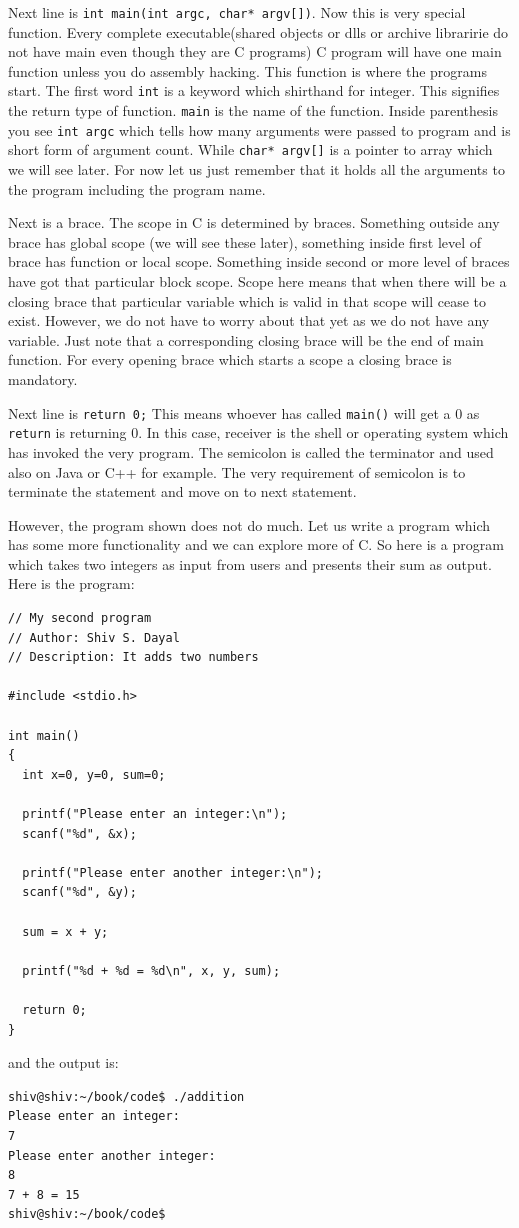 Next line is \texttt{int main(int argc, char* argv[])}. Now this is very special
function. Every complete executable(shared objects or dlls or archive
libraririe do not have main even though they are C programs) C program will
have one main function unless you do assembly hacking. This function is where
the programs start. The first word \texttt{int} is a keyword which shirthand
for integer. This signifies the return type of function. \texttt{main} is the
name of the function. Inside parenthesis you see \texttt{int argc} which tells
how many arguments were passed to program and is short form of argument
count. While \texttt{char* argv[]} is a pointer to array which we will see
later. For now let us just remember that it holds all the arguments to the
program including the program name.

Next is a brace. The scope in C is determined by braces. Something outside any
brace has global scope (we will see these later), something inside first level
of brace has function or local scope. Something inside second or more level of
braces have got that particular block scope. Scope here means that when there
will be a closing brace that particular variable which is valid in that scope
will cease to exist. However, we do not have to worry about that yet as we do
not have any variable. Just note that a corresponding closing brace will be the
end of main function. For every opening brace which starts a scope a closing
brace is mandatory.

Next line is \texttt{return 0;} This means whoever has called \texttt{main()}
will get a 0 as \texttt{return} is returning 0. In this case, receiver is the
shell or operating system 
which has invoked the very program. The semicolon is called the terminator and
used also on Java or C++ for example. The very requirement of semicolon is to
terminate the statement and move on to next statement.

However, the program shown does not do much. Let us write a program which has
some more functionality and we can explore more of C. So here is a program
which takes two integers as input from users and presents their sum as
output. Here is the program:

\begin{verbatim}
// My second program
// Author: Shiv S. Dayal
// Description: It adds two numbers

#include <stdio.h>

int main()
{
  int x=0, y=0, sum=0;

  printf("Please enter an integer:\n");
  scanf("%d", &x);

  printf("Please enter another integer:\n");
  scanf("%d", &y);

  sum = x + y;

  printf("%d + %d = %d\n", x, y, sum);

  return 0;
}
\end{verbatim}
and the output is:
\begin{verbatim}
shiv@shiv:~/book/code$ ./addition
Please enter an integer:
7
Please enter another integer:
8
7 + 8 = 15
shiv@shiv:~/book/code$
\end{verbatim}

